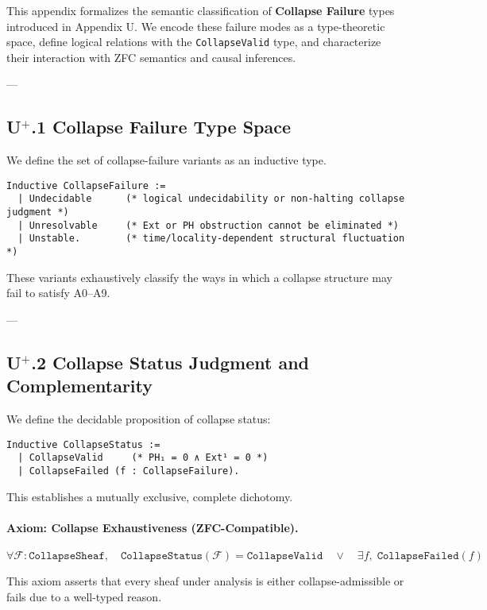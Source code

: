 \documentclass[11pt]{article}
\begin{document}
This appendix formalizes the semantic classification of \textbf{Collapse Failure} types introduced in Appendix U.  
We encode these failure modes as a type-theoretic space, define logical relations with the \texttt{CollapseValid} type,  
and characterize their interaction with ZFC semantics and causal inferences.

---

\subsection*{U$^{+}$.1 Collapse Failure Type Space}

We define the set of collapse-failure variants as an inductive type.

\begin{lstlisting}[language=Coq]
Inductive CollapseFailure :=
  | Undecidable      (* logical undecidability or non-halting collapse judgment *)
  | Unresolvable     (* Ext or PH obstruction cannot be eliminated *)
  | Unstable.        (* time/locality-dependent structural fluctuation *)
\end{lstlisting}

These variants exhaustively classify the ways in which a collapse structure may fail to satisfy A0–A9.

---

\subsection*{U$^{+}$.2 Collapse Status Judgment and Complementarity}

We define the decidable proposition of collapse status:

\begin{lstlisting}[language=Coq]
Inductive CollapseStatus :=
  | CollapseValid     (* PH₁ = 0 ∧ Ext¹ = 0 *)
  | CollapseFailed (f : CollapseFailure).
\end{lstlisting}

This establishes a mutually exclusive, complete dichotomy.

\paragraph{Axiom: Collapse Exhaustiveness (ZFC-Compatible).}
\[
\forall \mathcal{F} : \texttt{CollapseSheaf},\quad
\texttt{CollapseStatus}(\mathcal{F}) = \texttt{CollapseValid}
\quad \lor \quad
\exists f,\; \texttt{CollapseFailed}(f)
\]

This axiom asserts that every sheaf under analysis is either collapse-admissible or fails due to a well-typed reason.
\end{document}
